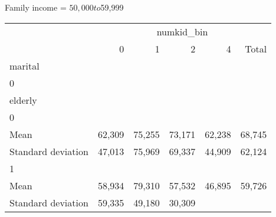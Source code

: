 Family income = $50,000 to $59,999
\begin{tabular}{llllll}
\cline{1-6}
\multicolumn{1}{c}{} &
  \multicolumn{5}{|c}{numkid\_bin} \\
\multicolumn{1}{c}{} &
  \multicolumn{1}{|r}{0} &
  \multicolumn{1}{r}{1} &
  \multicolumn{1}{r}{2} &
  \multicolumn{1}{r}{4} &
  \multicolumn{1}{r}{Total} \\
\cline{1-6}
\multicolumn{1}{l}{marital} &
  \multicolumn{1}{|r}{} &
  \multicolumn{1}{r}{} &
  \multicolumn{1}{r}{} &
  \multicolumn{1}{r}{} &
  \multicolumn{1}{r}{} \\
\multicolumn{1}{l}{\hspace{1em}0} &
  \multicolumn{1}{|r}{} &
  \multicolumn{1}{r}{} &
  \multicolumn{1}{r}{} &
  \multicolumn{1}{r}{} &
  \multicolumn{1}{r}{} \\
\multicolumn{1}{l}{\hspace{2em}elderly} &
  \multicolumn{1}{|r}{} &
  \multicolumn{1}{r}{} &
  \multicolumn{1}{r}{} &
  \multicolumn{1}{r}{} &
  \multicolumn{1}{r}{} \\
\multicolumn{1}{l}{\hspace{3em}0} &
  \multicolumn{1}{|r}{} &
  \multicolumn{1}{r}{} &
  \multicolumn{1}{r}{} &
  \multicolumn{1}{r}{} &
  \multicolumn{1}{r}{} \\
\multicolumn{1}{l}{\hspace{4em}Mean} &
  \multicolumn{1}{|r}{62,309} &
  \multicolumn{1}{r}{75,255} &
  \multicolumn{1}{r}{73,171} &
  \multicolumn{1}{r}{62,238} &
  \multicolumn{1}{r}{68,745} \\
\multicolumn{1}{l}{\hspace{4em}Standard deviation} &
  \multicolumn{1}{|r}{47,013} &
  \multicolumn{1}{r}{75,969} &
  \multicolumn{1}{r}{69,337} &
  \multicolumn{1}{r}{44,909} &
  \multicolumn{1}{r}{62,124} \\
\multicolumn{1}{l}{\hspace{3em}1} &
  \multicolumn{1}{|r}{} &
  \multicolumn{1}{r}{} &
  \multicolumn{1}{r}{} &
  \multicolumn{1}{r}{} &
  \multicolumn{1}{r}{} \\
\multicolumn{1}{l}{\hspace{4em}Mean} &
  \multicolumn{1}{|r}{58,934} &
  \multicolumn{1}{r}{79,310} &
  \multicolumn{1}{r}{57,532} &
  \multicolumn{1}{r}{46,895} &
  \multicolumn{1}{r}{59,726} \\
\multicolumn{1}{l}{\hspace{4em}Standard deviation} &
  \multicolumn{1}{|r}{59,335} &
  \multicolumn{1}{r}{49,180} &
  \multicolumn{1}{r}{30,309} &

\end{tabular}
